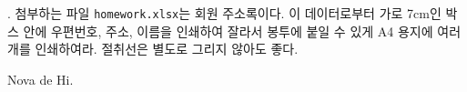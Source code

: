 \vfill

\begin{questionp}
 \bangotsuite.
첨부하는 파일 \verb|homework.xlsx|는 회원 주소록이다. 이 데이터로부터
가로 7cm인 박스 안에 우편번호, 주소, 이름을 인쇄하여 잘라서 봉투에 붙일 수
있게 A4 용지에 여러 개를 인쇄하여라. 절취선은 별도로 그리지 않아도 좋다.

\medskip

\leavevmode{}

\end{questionp}


\vfill
\hfill Nova de Hi.




